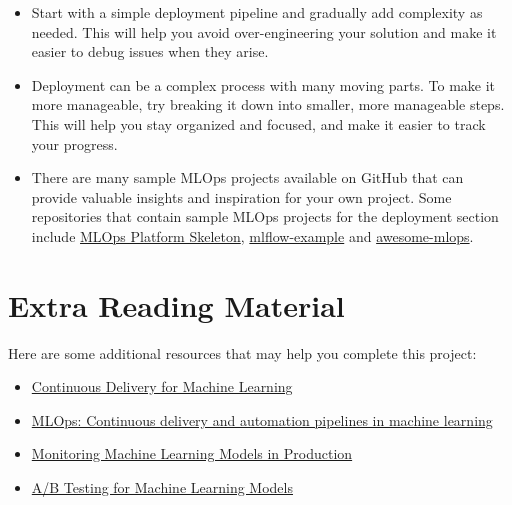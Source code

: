 \documentclass[a4paper]{article}
\begin{document}
	\begin{itemize}
	\item Start with a simple deployment pipeline and gradually add complexity as needed. This will help you avoid over-engineering your solution and make it easier to debug issues when they arise.
	\item Deployment can be a complex process with many moving parts. To make it more manageable, try breaking it down into smaller, more manageable steps. This will help you stay organized and focused, and make it easier to track your progress.
	\item There are many sample MLOps projects available on GitHub that can provide valuable insights and inspiration for your own project. Some repositories that contain sample MLOps projects for the deployment section include \href{https://github.com/dpleus/mlops}{MLOps Platform Skeleton}, \href{https://github.com/alfozan/mlflow-example}{mlflow-example} and \href{https://github.com/kelvins/awesome-mlops} {awesome-mlops}.
	\end{itemize}

	\section{Extra Reading Material}
	Here are some additional resources that may help you complete this project:

	\begin{itemize}
	\item \href{https://martinfowler.com/articles/cd4ml.html}{Continuous Delivery for Machine Learning}
	\item \href{https://cloud.google.com/solutions/machine-learning/mlops-continuous-delivery-and-automation-pipelines-in-machine-learning}{MLOps: Continuous delivery and automation pipelines in machine learning}
	\item \href{https://christophergs.com/machine learning/2020/03/14/how-to-monitor-machine-learning-models/}{Monitoring Machine Learning Models in Production}
	\item \href{https://mlinproduction.com/ab-test-ml-models-deployment-series-08/}{A/B Testing for Machine Learning Models}
	\end{itemize}

	
\end{document}
